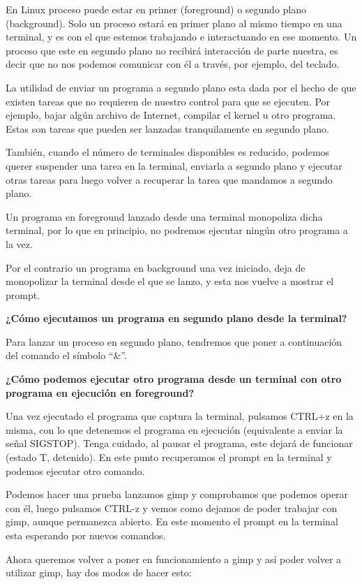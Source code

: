 \documentclass[12pt]{article}
\begin{document}
En Linux proceso puede estar en primer (foreground) o segundo plano
(background). Solo un proceso estará en primer plano al mismo tiempo en
una terminal, y es con el que estemos trabajando e interactuando en ese 
momento. Un proceso que este en segundo plano no recibirá interacción  
de parte nuestra, es decir que no nos podemos comunicar con él 
a través, por ejemplo, del teclado. 

La utilidad de enviar un programa a 
segundo plano esta dada por el hecho de que existen tareas que no 
requieren de nuestro control para que se ejecuten. Por ejemplo, bajar 
algún archivo de Internet, compilar el kernel u otro programa. Estas son 
tareas que pueden ser lanzadas tranquilamente en segundo plano. 

También, cuando el número de terminales disponibles es reducido,  
podemos querer suspender una tarea en la terminal, enviarla a 
segundo plano y ejecutar otras tareas para luego volver a recuperar la 
tarea que mandamos a segundo plano. 

Un programa en foreground lanzado desde una terminal monopoliza dicha
terminal, por lo que en principio, no podremos ejecutar ningún otro 
programa a la vez. 

Por el contrario un programa en background una vez iniciado, deja de 
monopolizar la terminal desde el que se lanzo, y esta nos vuelve a 
mostrar el prompt.

{\bf ¿Cómo ejecutamos un programa en segundo plano desde la terminal? }

Para lanzar un proceso en segundo plano, tendremos que poner a continuación 
del comando el símbolo ``\&''. 


{\bf ¿Cómo podemos ejecutar otro programa desde un terminal con otro
 programa en ejecución en foreground?}

Una vez ejecutado el programa que captura la terminal, pulsamos CTRL+z 
en la misma, con lo que detenemos el programa en ejecución (equivalente
a enviar la señal SIGSTOP). Tenga cuidado, al pausar el programa, este 
dejará de funcionar (estado T, detenido). En este punto recuperamos 
el prompt en la terminal y podemos ejecutar otro comando. 

 Podemos hacer una prueba lanzamos gimp y comprobamos que podemos operar con él, luego pulsamos CTRL-z y vemos como dejamos de poder trabajar con gimp, aunque permanezca abierto. En este momento el prompt en la terminal esta 
esperando por nuevos comandos.  

Ahora queremos volver a poner en funcionamiento a gimp y así poder volver a utilizar gimp, hay dos modos de hacer esto: 
\end{document}
